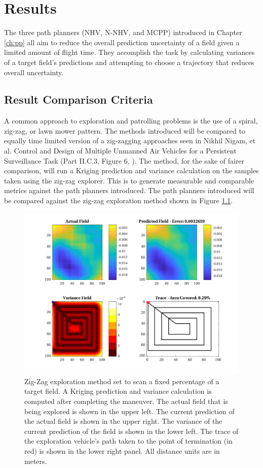 \chapter{Results}
The three path planners (NHV, N-NHV, and MCPP) introduced in Chapter \ref{ch:pp} all aim to reduce the overall prediction uncertainty of a field given a limited amount of flight time. They accomplish the task by calculating variances of a target field's predictions and attempting to choose a trajectory that reduces overall uncertainty. 

\section{Result Comparison Criteria}
A common approach to exploration and patrolling problems is the use of a spiral, zig-zag, or lawn mower pattern. The methods introduced will be compared to equally time limited version of a zig-zagging approaches seen in Nikhil Nigam, et al. Control and Design of Multiple Unmanned Air Vehicles for a Persistent Surveillance Task (Part II.C.3, Figure 6, \cite{nigam:zigzag}). The method, for the sake of fairer comparison, will run a Kriging prediction and variance calculation on the samples taken using the zig-zag explorer. This is to generate measurable and comparable metrics against the path planners introduced. The path planners introduced will be compared against the zig-zag exploration method shown in Figure \ref{fig:zigzag4}.

\begin{figure}[hbt!]
    \centering
    \includegraphics[width=0.9\linewidth]{figures/hbresults/zz_10p_100x100_sf_25_seed_2.png}
    \captionsetup{skip=0.20\baselineskip}
    \ssp
    \caption{Zig-Zag exploration method set to scan a fixed percentage of a target field. A Kriging prediction and variance calculation is computed after completing the maneuver. The actual field that is being explored is shown in the upper left. The current prediction of the actual field is shown in the upper right. The variance of the current prediction of the field is shown in the lower left. The trace of the exploration vehicle's path taken to the point of termination (in red) is shown in the lower right panel. All distance units are in meters.}
    \label{fig:zigzag4}
\end{figure}

